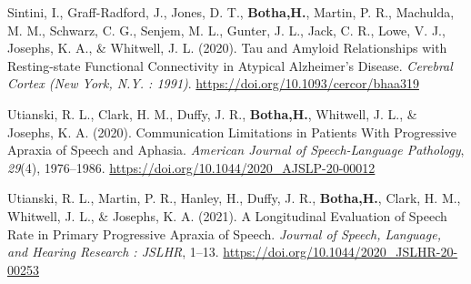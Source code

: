 \documentclass[11pt, a4paper]{awesome-cv}
\begin{document}
\leavevmode\hypertarget{ref-sintini_tau_2020}{}%
Sintini, I., Graff-Radford, J., Jones, D. T., \textbf{Botha,H.}, Martin,
P. R., Machulda, M. M., Schwarz, C. G., Senjem, M. L., Gunter, J. L.,
Jack, C. R., Lowe, V. J., Josephs, K. A., \& Whitwell, J. L. (2020). Tau
and {Amyloid} {Relationships} with {Resting}-state {Functional}
{Connectivity} in {Atypical} {Alzheimer}'s {Disease}. \emph{Cerebral
Cortex (New York, N.Y. : 1991)}.
\url{https://doi.org/10.1093/cercor/bhaa319}

\leavevmode\hypertarget{ref-utianski_communication_2020}{}%
Utianski, R. L., Clark, H. M., Duffy, J. R., \textbf{Botha,H.},
Whitwell, J. L., \& Josephs, K. A. (2020). Communication {Limitations}
in {Patients} {With} {Progressive} {Apraxia} of {Speech} and {Aphasia}.
\emph{American Journal of Speech-Language Pathology}, \emph{29}(4),
1976--1986. \url{https://doi.org/10.1044/2020_AJSLP-20-00012}

\leavevmode\hypertarget{ref-utianski_longitudinal_2021}{}%
Utianski, R. L., Martin, P. R., Hanley, H., Duffy, J. R.,
\textbf{Botha,H.}, Clark, H. M., Whitwell, J. L., \& Josephs, K. A.
(2021). A {Longitudinal} {Evaluation} of {Speech} {Rate} in {Primary}
{Progressive} {Apraxia} of {Speech}. \emph{Journal of Speech, Language,
and Hearing Research : JSLHR}, 1--13.
\url{https://doi.org/10.1044/2020_JSLHR-20-00253}

\endgroup
\end{document}
